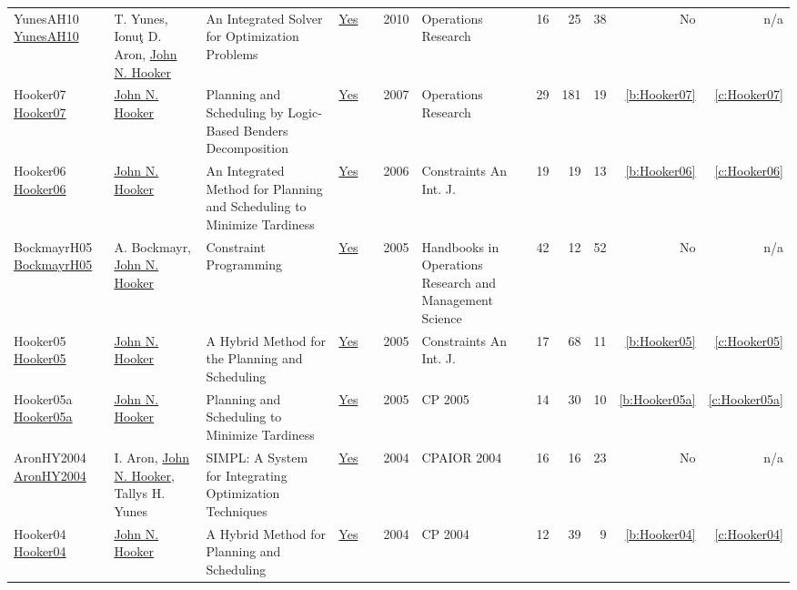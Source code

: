 {\begin{longtable}{>{\raggedright\arraybackslash}p{3cm}>{\raggedright\arraybackslash}p{6cm}>{\raggedright\arraybackslash}p{6.5cm}rrrp{2.5cm}rrrrr}
YunesAH10 \href{http://dx.doi.org/10.1287/opre.1090.0733}{YunesAH10} & T. Yunes, Ionuţ D. Aron, \hyperref[auth:a162]{John N. Hooker} & An Integrated Solver for Optimization Problems & \href{works/YunesAH10.pdf}{Yes} & \cite{YunesAH10} & 2010 & Operations Research & 16 & 25 & 38 & No & n/a\\
Hooker07 \href{http://dx.doi.org/10.1287/opre.1060.0371}{Hooker07} & \hyperref[auth:a162]{John N. Hooker} & Planning and Scheduling by Logic-Based Benders Decomposition & \href{works/Hooker07.pdf}{Yes} & \cite{Hooker07} & 2007 & Operations Research & 29 & 181 & 19 & \ref{b:Hooker07} & \ref{c:Hooker07}\\
Hooker06 \href{https://doi.org/10.1007/s10601-006-8060-2}{Hooker06} & \hyperref[auth:a162]{John N. Hooker} & An Integrated Method for Planning and Scheduling to Minimize Tardiness & \href{works/Hooker06.pdf}{Yes} & \cite{Hooker06} & 2006 & Constraints An Int. J. & 19 & 19 & 13 & \ref{b:Hooker06} & \ref{c:Hooker06}\\
BockmayrH05 \href{http://dx.doi.org/10.1016/s0927-0507(05)12010-6}{BockmayrH05} & A. Bockmayr, \hyperref[auth:a162]{John N. Hooker} & Constraint Programming & \href{works/BockmayrH05.pdf}{Yes} & \cite{BockmayrH05} & 2005 & Handbooks in Operations Research and Management Science & 42 & 12 & 52 & No & n/a\\
Hooker05 \href{https://doi.org/10.1007/s10601-005-2812-2}{Hooker05} & \hyperref[auth:a162]{John N. Hooker} & A Hybrid Method for the Planning and Scheduling & \href{works/Hooker05.pdf}{Yes} & \cite{Hooker05} & 2005 & Constraints An Int. J. & 17 & 68 & 11 & \ref{b:Hooker05} & \ref{c:Hooker05}\\
Hooker05a \href{https://doi.org/10.1007/11564751\_25}{Hooker05a} & \hyperref[auth:a162]{John N. Hooker} & Planning and Scheduling to Minimize Tardiness & \href{works/Hooker05a.pdf}{Yes} & \cite{Hooker05a} & 2005 & CP 2005 & 14 & 30 & 10 & \ref{b:Hooker05a} & \ref{c:Hooker05a}\\
AronHY2004 \href{http://dx.doi.org/10.1007/978-3-540-24664-0_2}{AronHY2004} & I. Aron, \hyperref[auth:a162]{John N. Hooker}, Tallys H. Yunes & SIMPL: A System for Integrating Optimization Techniques & \href{works/AronHY2004.pdf}{Yes} & \cite{AronHY2004} & 2004 & CPAIOR 2004 & 16 & 16 & 23 & No & n/a\\
Hooker04 \href{https://doi.org/10.1007/978-3-540-30201-8\_24}{Hooker04} & \hyperref[auth:a162]{John N. Hooker} & A Hybrid Method for Planning and Scheduling & \href{works/Hooker04.pdf}{Yes} & \cite{Hooker04} & 2004 & CP 2004 & 12 & 39 & 9 & \ref{b:Hooker04} & \ref{c:Hooker04}\\

\end{longtable}}
